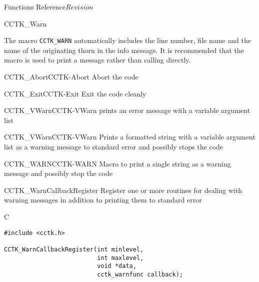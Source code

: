 \begin{cactuspart}{ Functions Reference}{}{$Revision$}
\begin{FunctionDescription}{CCTK\_Warn}
\begin{Discussion}
The macro \verb|CCTK_WARN| automatically includes the line number, file name
and the name of the originating thorn in the
info message. It is recommended that the macro  is used
to print a message rather than calling  directly.
\end{Discussion}

\begin{SeeAlsoSection}
\begin{SeeAlso2}{CCTK\_Abort}{CCTK-Abort}
Abort the code
\end{SeeAlso2}
\begin{SeeAlso2}{CCTK\_Exit}{CCTK-Exit}
Exit the code cleanly
\end{SeeAlso2}
\begin{SeeAlso2}{CCTK\_VWarn}{CCTK-VWarn}
prints an error message with a variable argument list
\end{SeeAlso2}
\begin{SeeAlso2}{CCTK\_VWarn}{CCTK-VWarn}
Prints a formatted string with a variable argument list as a warning
message to standard error and possibly stops the code
\end{SeeAlso2}
\begin{SeeAlso2}{CCTK\_WARN}{CCTK-WARN}
Macro to print a single string as a warning message and possibly stop the code
\end{SeeAlso2}
\end{SeeAlsoSection}
\end{FunctionDescription}



\begin{FunctionDescription}{CCTK\_WarnCallbackRegister}
\label{CCTK-WARNCallbackRegister}
Register one or more routines for dealing with warning messages in
addition to printing them to standard error

\begin{SynopsisSection}
\begin{Synopsis}{C}
\begin{verbatim}
#include <cctk.h>

CCTK_WarnCallbackRegister(int minlevel,
                          int maxlevel,
                          void *data,
                          cctk_warnfunc callback);

\end{verbatim}
\end{Synopsis}
\end{SynopsisSection}


\end{FunctionDescription}
\end{cactuspart}

